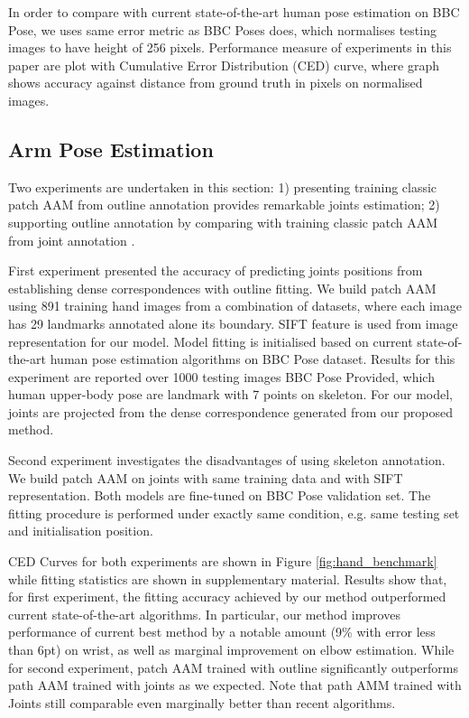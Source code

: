 In order to compare with current state-of-the-art human pose estimation on BBC Pose, we uses same error metric as BBC Poses does, which normalises testing images to have height of 256 pixels. Performance measure of experiments in this paper are plot with Cumulative Error Distribution (CED) curve, where graph shows accuracy against distance from ground truth in pixels on normalised images.

\subsection{Arm Pose Estimation}
\label{exp:benchmark}
Two experiments are undertaken in this section: 1) presenting training classic patch AAM from outline annotation provides remarkable joints estimation; 2) supporting outline annotation by comparing with training classic patch AAM from joint annotation .

First experiment presented the accuracy of predicting joints positions from establishing dense correspondences with outline fitting. We build patch AAM using 891 training hand images from a combination of datasets, where each image has 29 landmarks annotated alone its boundary. SIFT \cite{PoseletsICCV09} feature is used from image representation for our model. Model fitting is initialised based on current state-of-the-art human pose estimation algorithms on BBC Pose dataset. Results for this experiment are reported over 1000 testing images BBC Pose Provided, which human upper-body pose are landmark with 7 points on skeleton. For our model, joints are projected from the dense correspondence generated from our proposed method.

Second experiment investigates the disadvantages of using skeleton annotation. We build patch AAM on joints with same training data and with SIFT representation. Both models are fine-tuned on BBC Pose validation set. The fitting procedure is performed under exactly same condition, e.g. same testing set and initialisation position. 

CED Curves for both experiments are shown in Figure \ref{fig:hand_benchmark} while fitting statistics are shown in supplementary material. Results show that, for first experiment, the fitting accuracy achieved by our method outperformed current state-of-the-art algorithms. In particular, our method improves performance of current best method \cite{pfister2015flowing} by a notable amount (9\% with error less than 6pt) on wrist, as well as marginal improvement on elbow estimation. While for second experiment, patch AAM trained with outline significantly outperforms path AAM trained with joints as we expected. Note that path AMM trained with Joints still comparable even marginally better than recent algorithms.

